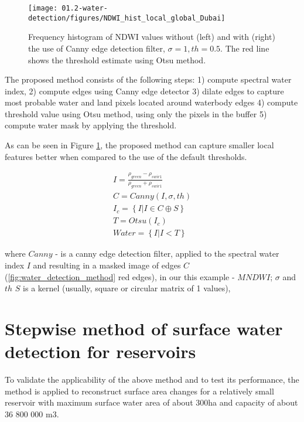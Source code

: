 \begin{figure}
	\centering
	\texttt{[image: 01.2-water-detection/figures/NDWI\_hist\_local\_global\_Dubai]}
	\caption{Frequency histogram of NDWI values without (left) and with (right) the use of Canny edge detection filter, $\sigma=1, th=0.5$. The red line shows the threshold estimate using Otsu method.}
	\label{fig:water_detection_method_local_water_hist_Dubai}
\end{figure}

The proposed method consists of the following steps: 1) compute spectral water index, 2) compute edges using Canny edge detector 3) dilate edges to capture most probable water and land pixels located around waterbody edges 4) compute threshold value using Otsu method, using only the pixels in the buffer 5) compute water mask by applying the threshold.

As can be seen in Figure \ref{fig:water_detection_method_local_water_hist_Dubai}, the proposed method can capture smaller local features better when compared to the use of the default thresholds.


\begin{gather}
I=\frac{\rho_{green}-\rho_{swir1}}{\rho_{green}+\rho_{swir1}} \\
C=Canny(I,\sigma,th) \\
I_c=\left\{ I | I \in C \oplus S \right\} \\
T=Otsu(I_c) \\
Water = \left\{ I | I < T \right\}
\end{gather}


where $Canny$ - is a canny edge detection filter, applied to the spectral water index $I$ and resulting in a masked image of edges $C$ (\ref{fig:water_detection_method} red edges), in our this example - $MNDWI$; $\sigma$ and $th$  $S$ is a kernel (usually, square or circular matrix of 1 values), 

\section{Stepwise method of surface water detection for reservoirs}

To validate the applicability of the above method and to test its performance, the method is applied to reconstruct surface area changes for a relatively small reservoir with maximum surface water area of about 300ha and capacity of about 36 800 000 m3. 

